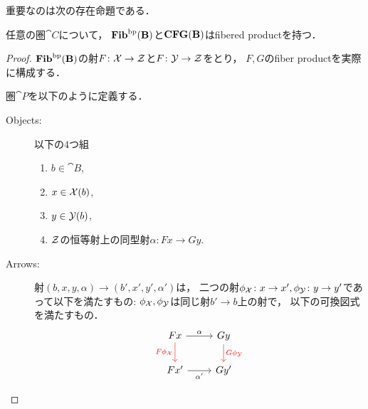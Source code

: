 重要なのは次の存在命題である．
\begin{Prop}
    任意の圏$\cat{C}$について，
    $\mathbf{Fib}^{\mathrm{bp}}(\mathbf{B})$と$\mathbf{CFG}(\mathbf{B})$はfibered productを持つ．
\end{Prop}
\begin{proof}
    $\mathbf{Fib}^{\mathrm{bp}}(\mathbf{B})$の射$F \colon \mathcal{X} \to \mathcal{Z}$と$F \colon \mathcal{Y} \to \mathcal{Z}$をとり，
    $F, G$のfiber productを実際に構成する．

    圏$\cat{P}$を以下のように定義する．
    \begin{description}
        \item[Objects:]
            以下の$4$つ組
            \begin{enumerate}
                \item $b \in \cat{B}$,
                \item $x \in \mathcal{X}(b)$,
                \item $y \in \mathcal{Y}(b)$,
                \item $\mathcal{Z}$の恒等射上の同型射$\alpha \colon Fx \to Gy$.
            \end{enumerate}
        
        \item[Arrows:] \mnewline
            射$(b, x, y, \alpha) \to (b', x', y', \alpha')$は，
            二つの射$\phi_{\mathcal{X}} \colon x \to x', \phi_{\mathcal{Y}} \colon y \to y'$であって以下を満たすもの:
            $\phi_{\mathcal{X}}, \phi_{\mathcal{Y}}$は同じ射$b' \to b$上の射で，
            以下の可換図式を満たすもの．
            \[
            \begin{tikzcd}
                Fx \ar[d, red, "F\phi_{\stX}"']\ar[r, "\alpha"]& Gy \ar[d, red, "G\phi_{\stY}"]\\
                Fx' \ar[r, "\alpha'"']& Gy'
            \end{tikzcd}
            \]
    \end{description}


\end{proof}
